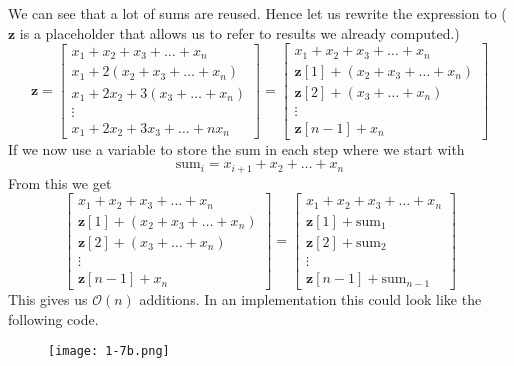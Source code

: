 \documentclass{article}
\begin{document}
We can see that a lot of sums are reused. Hence let us rewrite the expression to ($\mathbf{z}$ is a placeholder that allows us to refer to results we already computed.)
\begin{equation*}
\mathbf{z} =
    \begin{bmatrix}
        x_{1} + x_{2} + x_{3} + \dots + x_{n} \\
        x_{1} + 2\left(x_{2} + x_{3} + \dots + x_{n}\right) \\
        x_{1} + 2x_{2} + 3\left(x_{3} + \dots + x_{n}\right) \\
        \vdots
        \\
        x_{1} + 2x_{2} + 3x_{3} + \dots + nx_{n}
    \end{bmatrix} =
    \begin{bmatrix}
        x_{1} + x_{2} + x_{3} + \dots + x_{n} \\
        \mathbf{z}\left[1\right] +\left(x_{2} + x_{3} + \dots + x_{n}\right) \\
        \mathbf{z}\left[2\right] + \left(x_{3} + \dots + x_{n}\right) \\
        \vdots
        \\
        \mathbf{z}\left[n-1
        \right]+ x_{n}
    \end{bmatrix}
\end{equation*}
If we now use a variable to store the sum in each step where we start with
\begin{equation*}
    \text{sum}_{i} = x_{i + 1} + x_{2} + \dots + x_{n}
\end{equation*}
From this we get
\begin{equation*}
    \begin{bmatrix}
        x_{1} + x_{2} + x_{3} + \dots + x_{n} \\
        \mathbf{z}\left[1\right] +\left(x_{2} + x_{3} + \dots + x_{n}\right) \\
        \mathbf{z}\left[2\right] + \left(x_{3} + \dots + x_{n}\right) \\
        \vdots
        \\
        \mathbf{z}\left[n-1
        \right]+ x_{n}
    \end{bmatrix} = 
    \begin{bmatrix}
        x_{1} + x_{2} + x_{3} + \dots + x_{n} \\
        \mathbf{z}\left[1\right] +\text{sum}_{1} \\
        \mathbf{z}\left[2\right]  +\text{sum}_{2} \\
        \vdots
        \\
        \mathbf{z}\left[n-1
        \right]+\text{sum}_{n-1}
    \end{bmatrix}
\end{equation*}
This gives us $\mathcal{O}\left(n\right)$ additions. In an implementation this could look like the following code.
\begin{figure}[!hbt]
    \centering
\texttt{[image: 1-7b.png]}
\end{figure}
\end{document}
